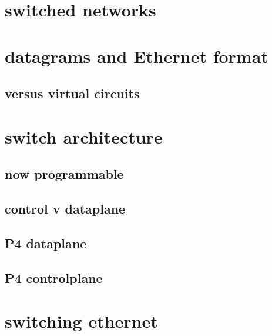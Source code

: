 \date{}
\title{}
\date{}

\begin{frame}
    \titlepage
\end{frame}

\section{switched networks}



\section{datagrams and Ethernet format}



\subsection{versus virtual circuits}



\section{switch architecture}

\subsection{now programmable}


\subsection{control v dataplane}


\subsection{P4 dataplane}


\subsection{P4 controlplane}


\section{switching ethernet}

